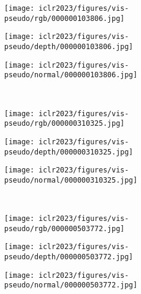 \documentclass{article} \usepackage{iclr2023_conference,times}
\begin{document}
\begin{figure}
     \centering
     \begin{subfigure}[b]{0.32\textwidth}
         \centering
         \texttt{[image: iclr2023/figures/vis-pseudo/rgb/000000103806.jpg]}
\label{fig:three sin x}
     \end{subfigure}
     \begin{subfigure}[b]{0.32\textwidth}
         \centering
         \texttt{[image: iclr2023/figures/vis-pseudo/depth/000000103806.jpg]}
\label{fig:five over x}
     \end{subfigure} 
     \begin{subfigure}[b]{0.32\textwidth}
         \centering
         \texttt{[image: iclr2023/figures/vis-pseudo/normal/000000103806.jpg]}
\label{fig:y equals x}
     \end{subfigure}
     \\
     \begin{subfigure}[b]{0.32\textwidth}
         \centering
         \texttt{[image: iclr2023/figures/vis-pseudo/rgb/000000310325.jpg]}
\label{fig:three sin x}
     \end{subfigure}
     \begin{subfigure}[b]{0.32\textwidth}
         \centering
         \texttt{[image: iclr2023/figures/vis-pseudo/depth/000000310325.jpg]}
\label{fig:five over x}
     \end{subfigure} 
     \begin{subfigure}[b]{0.32\textwidth}
         \centering
         \texttt{[image: iclr2023/figures/vis-pseudo/normal/000000310325.jpg]}
\label{fig:y equals x}
     \end{subfigure}
     \\
     \begin{subfigure}[b]{0.32\textwidth}
         \centering
         \texttt{[image: iclr2023/figures/vis-pseudo/rgb/000000503772.jpg]}
\label{fig:three sin x}
     \end{subfigure}
     \begin{subfigure}[b]{0.32\textwidth}
         \centering
         \texttt{[image: iclr2023/figures/vis-pseudo/depth/000000503772.jpg]}
\label{fig:five over x}
     \end{subfigure} 
     \begin{subfigure}[b]{0.32\textwidth}
         \centering
         \texttt{[image: iclr2023/figures/vis-pseudo/normal/000000503772.jpg]}

\end{subfigure}
\end{figure}
\end{document}
